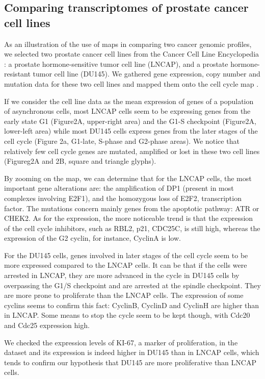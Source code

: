 \documentclass[a4,center,fleqn]{NAR}
\begin{document}
\subsection{Comparing transcriptomes of prostate cancer cell lines}

As an illustration of the use of maps in comparing two cancer genomic profiles, we
selected two prostate cancer cell lines from the Cancer Cell Line Encyclopedia
\cite{barretina2012cancer}: a prostate hormone-sensitive
tumor cell line (LNCAP), and a prostate hormone-resistant tumor cell line
(DU145). We gathered gene expression, copy number and mutation data for
these two cell lines and mapped them onto the cell cycle map
\cite{calzone2008comprehensive}.

If we consider the cell line data as the mean expression of genes of a
population of asynchronous cells, most LNCAP cells seem to be expressing genes
from the early state G1 (Figure2A, upper-right area) and the G1-S checkpoint
(Figure2A, lower-left area) while most DU145 cells express genes from the
later stages of the cell cycle (Figure 2a, G1-late, S-phase and G2-phase
areas).  We notice that relatively few cell cycle genes are mutated, amplified or lost
in these two cell lines (Figureg2A and 2B, square and triangle glyphs).

By zooming on the map, we can determine that for the LNCAP cells, the most
important gene alterations are: the amplification of DP1 (present in most
complexes involving E2F1), and the homozygous loss of E2F2, transcription
factor. The mutations concern mainly genes from the apoptotic pathway: ATR or
CHEK2. As for the expression, the more noticeable trend is that the expression
of the cell cycle inhibitors, such as RBL2, p21, CDC25C, is still high, whereas
the expression of the G2 cyclin, for instance, CyclinA is low.

For the DU145 cells, genes involved in later stages of the cell cycle seem to
be more expressed compared to the LNCAP cells. It can be that if the cells were
arrested in LNCAP, they are more advanced in the cycle in DU145 cells by
overpassing the G1/S checkpoint and are arrested at the spindle checkpoint.
They are more prone to proliferate than the LNCAP cells. The expression of some
cyclins seems to confirm this fact: CyclinB, CyclinD and CyclinH are higher
than in LNCAP. Some means to stop the cycle seem to be kept though, with Cdc20
and Cdc25 expression high.

We checked the expression levels of KI-67, a marker of proliferation, in the
dataset and its expression is indeed higher in DU145 than in LNCAP cells, which
tends to confirm our hypothesis that DU145 are more proliferative than LNCAP
cells.
\end{document}
